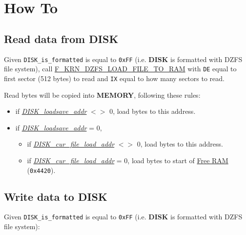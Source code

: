 \section{How To}

    \subsection{Read data from DISK}
    \label{sec:howto_readdata}
    Given \texttt{DISK\_is\_formatted} is equal to \texttt{0xFF} (i.e.
    \textbf{DISK} is formatted with DZFS file system), call
    \hyperref[func:fkrndzfsloadfiletoram]{F\_KRN\_DZFS\_LOAD\_FILE\_TO\_RAM}
    with \texttt{DE} equal to first sector (512 bytes) to read and \texttt{IX}
    equal to how many sectors to read.

    Read bytes will be copied into \textbf{MEMORY}, following these rules:

    \begin{itemize}
        \item if \textit{\hyperref[sec:ram_memmap]{DISK\_loadsave\_addr}} $<>$
        0, load bytes to this address.
        \item if \textit{\hyperref[sec:ram_memmap]{DISK\_loadsave\_addr}} = 0,
        \begin{itemize}
            \item if \textit{\hyperref[sec:ram_memmap]{DISK\_cur\_file\_load\_addr}}
            $<>$ 0, load bytes to this address.
            \item if \textit{\hyperref[sec:ram_memmap]{DISK\_cur\_file\_load\_addr}}
            = 0, load bytes to start of \hyperref[subsec:memmap:ram]{Free RAM}
            (\texttt{0x4420}).
        \end{itemize}
    \end{itemize}

    \subsection{Write data to DISK}
    \label{sec:howto_writedata}
    Given \texttt{DISK\_is\_formatted} is equal to \texttt{0xFF} (i.e.
    \textbf{DISK} is formatted with DZFS file system):

